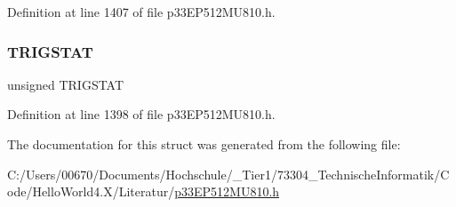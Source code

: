 Definition at line 1407 of file p33\+E\+P512\+M\+U810.\+h.

\mbox{\label{structtag_i_c16_c_o_n2_b_i_t_s_ab379549de54ac93ad4aa73686c34cb7c}} 
\subsubsection{\texorpdfstring{T\+R\+I\+G\+S\+T\+AT}{TRIGSTAT}}
{\footnotesize\ttfamily unsigned T\+R\+I\+G\+S\+T\+AT}



Definition at line 1398 of file p33\+E\+P512\+M\+U810.\+h.



The documentation for this struct was generated from the following file\+:\begin{DoxyCompactItemize}
\item 
C\+:/\+Users/00670/\+Documents/\+Hochschule/\+\_\+\+Tier1/73304\+\_\+\+Technische\+Informatik/\+Code/\+Hello\+World4.\+X/\+Literatur/\hyperlink{p33_e_p512_m_u810_8h}{p33\+E\+P512\+M\+U810.\+h}\end{DoxyCompactItemize}
